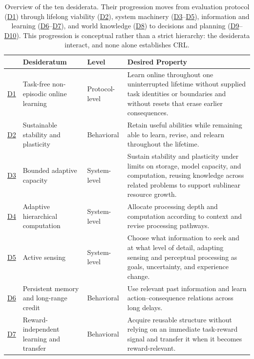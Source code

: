 \documentclass[10pt,journal,compsoc]{IEEEtran}
\DeclareRobustCommand{\Dref}[1]{\hyperref[sec:d#1]{D#1}}
\begin{document}
\iffalse
\begin{table}[!t]
    \caption{Overview of the ten desiderata.
    Their progression moves from evaluation protocol (\Dref{1}) through lifelong viability (\Dref{2}), system machinery (\Dref{3}--\Dref{5}), information and learning (\Dref{6}--\Dref{7}), and world knowledge (\Dref{8}) to decisions and planning (\Dref{9}--\Dref{10}).
    This progression is conceptual rather than a strict hierarchy: the desiderata interact, and none alone establishes CRL.}
    \label{tab:desiderata}
    \centering
    \renewcommand{\arraystretch}{1.12}
    \begin{tabularx}{\textwidth}{@{}c>{\raggedright\arraybackslash}p{}>{\raggedright\arraybackslash}p{}
    >{\raggedright\arraybackslash}X@{}}
        \toprule
        & \textbf{Desideratum} & \textbf{Level} & \textbf{Desired Property} \\
        \midrule
        \Dref{1} & Task-free non-episodic online learning &
        Protocol-level &
        Learn online throughout one uninterrupted lifetime without supplied task identities or boundaries and without resets that erase earlier consequences.\\
        \Dref{2} & Sustainable stability and plasticity &
        Behavioral &
        Retain useful abilities while remaining able to learn, revise, and relearn throughout the lifetime.\\
        \Dref{3} & Bounded adaptive capacity &
        System-level &
        Sustain stability and plasticity under limits on storage, model capacity, and computation, reusing knowledge across related problems to support sublinear resource growth.\\
        \Dref{4} & Adaptive hierarchical computation &
        System-level &
        Allocate processing depth and computation according to context and revise processing pathways.\\
        \Dref{5} & Active sensing &
        System-level &
        Choose what information to seek and at what level of detail, adapting sensing and perceptual processing as goals, uncertainty, and experience change.\\
        \Dref{6} & Persistent memory and long-range credit &
        Behavioral &
        Use relevant past information and learn action--consequence relations across long delays.\\
        \Dref{7} & Reward-independent learning and transfer &
        Behavioral &
        Acquire reusable structure without relying on an immediate task-reward signal and transfer it when it becomes reward-relevant.\\

\end{tabularx}
\end{table}
\end{document}

